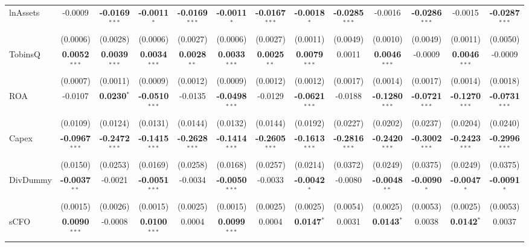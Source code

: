 \begin{landscape}
\begin{table}[H]
\begin{tabular}{lcccccccccccc}
lnAssets & -0.0009 & \textbf{-0.0169}$^{***}$ & \textbf{-0.0011}$^{*}$ & \textbf{-0.0169}$^{***}$ & \textbf{-0.0011}$^{*}$ & \textbf{-0.0167}$^{***}$ & \textbf{-0.0018}$^{*}$ & \textbf{-0.0285}$^{***}$ & -0.0016 & \textbf{-0.0286}$^{***}$ & -0.0015 & \textbf{-0.0287}$^{***}$ \\
 & (0.0006) & (0.0028) & (0.0006) & (0.0027) & (0.0006) & (0.0027) & (0.0011) & (0.0049) & (0.0010) & (0.0049) & (0.0011) & (0.0050) \\
TobinsQ & \textbf{0.0052}$^{***}$ & \textbf{0.0039}$^{***}$ & \textbf{0.0034}$^{***}$ & \textbf{0.0028}$^{**}$ & \textbf{0.0033}$^{***}$ & \textbf{0.0025}$^{**}$ & \textbf{0.0079}$^{***}$ & 0.0011 & \textbf{0.0046}$^{***}$ & -0.0009 & \textbf{0.0046}$^{***}$ & -0.0009 \\
 & (0.0007) & (0.0011) & (0.0009) & (0.0012) & (0.0009) & (0.0012) & (0.0012) & (0.0017) & (0.0014) & (0.0017) & (0.0014) & (0.0018) \\
ROA & -0.0107 & \textbf{0.0230}$^{*}$ & \textbf{-0.0510}$^{***}$ & -0.0135 & \textbf{-0.0498}$^{***}$ & -0.0129 & \textbf{-0.0621}$^{***}$ & -0.0188 & \textbf{-0.1280}$^{***}$ & \textbf{-0.0721}$^{***}$ & \textbf{-0.1270}$^{***}$ & \textbf{-0.0731}$^{***}$ \\
 & (0.0109) & (0.0124) & (0.0131) & (0.0144) & (0.0132) & (0.0144) & (0.0192) & (0.0227) & (0.0202) & (0.0237) & (0.0204) & (0.0240) \\
Capex & \textbf{-0.0967}$^{***}$ & \textbf{-0.2472}$^{***}$ & \textbf{-0.1415}$^{***}$ & \textbf{-0.2628}$^{***}$ & \textbf{-0.1414}$^{***}$ & \textbf{-0.2605}$^{***}$ & \textbf{-0.1613}$^{***}$ & \textbf{-0.2816}$^{***}$ & \textbf{-0.2420}$^{***}$ & \textbf{-0.3002}$^{***}$ & \textbf{-0.2423}$^{***}$ & \textbf{-0.2996}$^{***}$ \\
 & (0.0150) & (0.0253) & (0.0169) & (0.0258) & (0.0168) & (0.0257) & (0.0214) & (0.0372) & (0.0249) & (0.0375) & (0.0249) & (0.0375) \\
DivDummy & \textbf{-0.0037}$^{**}$ & -0.0021 & \textbf{-0.0051}$^{***}$ & -0.0034 & \textbf{-0.0050}$^{***}$ & -0.0033 & \textbf{-0.0042}$^{*}$ & -0.0080 & \textbf{-0.0048}$^{**}$ & \textbf{-0.0090}$^{*}$ & \textbf{-0.0047}$^{*}$ & \textbf{-0.0091}$^{*}$ \\
 & (0.0015) & (0.0026) & (0.0015) & (0.0025) & (0.0015) & (0.0025) & (0.0025) & (0.0054) & (0.0025) & (0.0053) & (0.0025) & (0.0053) \\
sCFO & \textbf{0.0090}$^{***}$ & -0.0008 & \textbf{0.0100}$^{***}$ & 0.0004 & \textbf{0.0099}$^{***}$ & 0.0004 & \textbf{0.0147}$^{*}$ & 0.0031 & \textbf{0.0143}$^{*}$ & 0.0038 & \textbf{0.0142}$^{*}$ & 0.0037 \\

\end{tabular}
\end{table}
\end{landscape}
